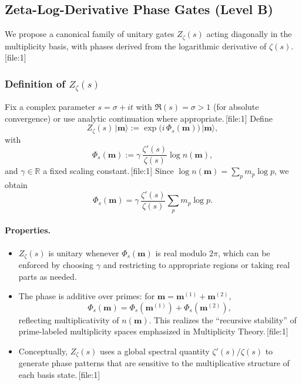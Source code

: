 \documentclass[11pt]{article}
\begin{document}
\subsection{Zeta-Log-Derivative Phase Gates (Level B)}

We propose a canonical family of unitary gates \(Z_\zeta(s)\) acting diagonally in the multiplicity basis, with phases derived from the logarithmic derivative of \(\zeta(s)\).\,[file:1]

\subsubsection{Definition of \(Z_\zeta(s)\)}

Fix a complex parameter \(s = \sigma + i t\) with \(\Re(s) = \sigma > 1\) (for absolute convergence) or use analytic continuation where appropriate.\,[file:1] Define
\[
Z_\zeta(s)\, \lvert \mathbf{m} \rangle := \exp\big(i\, \Phi_s(\mathbf{m})\big)\, \lvert \mathbf{m} \rangle,
\]
with
\[
\Phi_s(\mathbf{m}) := \gamma\, \frac{\zeta'(s)}{\zeta(s)} \log n(\mathbf{m}),
\]
and \(\gamma \in \mathbb{R}\) a fixed scaling constant.\,[file:1] Since \(\log n(\mathbf{m}) = \sum_p m_p \log p\), we obtain
\[
\Phi_s(\mathbf{m}) = \gamma\, \frac{\zeta'(s)}{\zeta(s)} \sum_{p} m_p \log p.
\]

\paragraph{Properties.} 

\begin{itemize}[leftmargin=*]
    \item \(Z_\zeta(s)\) is unitary whenever \(\Phi_s(\mathbf{m})\) is real modulo \(2\pi\), which can be enforced by choosing \(\gamma\) and restricting to appropriate regions or taking real parts as needed.
    \item The phase is additive over primes: for \(\mathbf{m} = \mathbf{m}^{(1)} + \mathbf{m}^{(2)}\),
    \[
    \Phi_s(\mathbf{m}) = \Phi_s(\mathbf{m}^{(1)}) + \Phi_s(\mathbf{m}^{(2)}),
    \]
    reflecting multiplicativity of \(n(\mathbf{m})\). This realizes the ``recursive stability'' of prime-labeled multiplicity spaces emphasized in Multiplicity Theory.\,[file:1]
    \item Conceptually, \(Z_\zeta(s)\) uses a global spectral quantity \(\zeta'(s)/\zeta(s)\) to generate phase patterns that are sensitive to the multiplicative structure of each basis state.\,[file:1]
\end{itemize}
\end{document}
